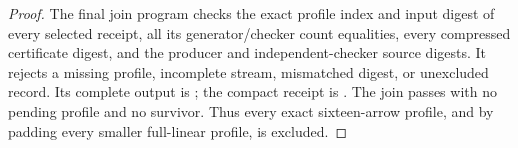 \begin{proof}
The final join program
 checks the
exact profile index and input digest of every selected
receipt, all its generator/checker count equalities,
every compressed certificate digest, and the producer
and independent-checker source digests. It rejects a
missing profile, incomplete stream, mismatched digest,
or unexcluded record. Its complete output is
;
the compact receipt is
.
The join passes with no pending profile and no survivor.
Thus every exact sixteen-arrow profile, and by padding
every smaller full-linear profile, is excluded.
\end{proof}
